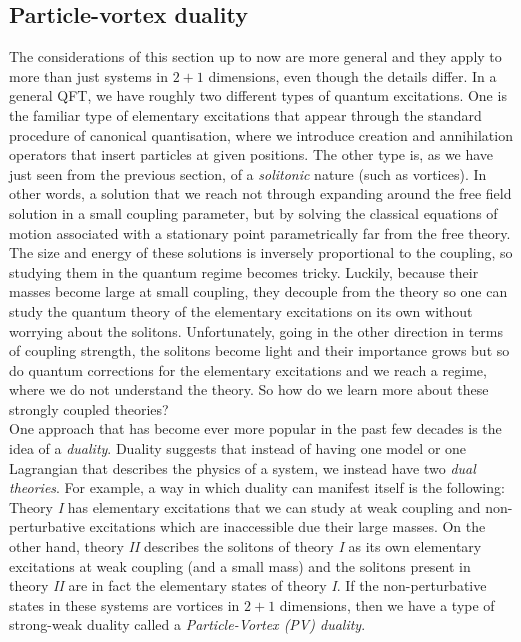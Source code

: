     \subsection{Particle-vortex duality}
    The considerations of this section up to now are more general and they apply to more than just systems in $2+1$ dimensions, even though the details differ. In a general QFT, we have roughly two different types of quantum excitations. One is the familiar type of elementary excitations that appear through the standard procedure of canonical quantisation, where we introduce creation and annihilation operators that insert particles at  given positions. The other type is, as we have just seen from the previous section, of a \textit{solitonic} nature (such as vortices). In other words, a solution that we reach not through expanding around the free field solution in a small coupling parameter, but by solving the classical equations of motion associated with a stationary point parametrically far from the free theory. The size and energy of these solutions is inversely proportional to the coupling, so studying them in the quantum regime becomes tricky. Luckily, because their masses become large at small coupling, they decouple from the theory so one can study the quantum theory of the elementary excitations on its own without worrying about the solitons. Unfortunately, going in the other direction in terms of coupling strength, the solitons become light and their importance grows but so do quantum corrections for the elementary excitations and we reach a regime, where we do not understand the theory. So how do we learn more about these strongly coupled theories? \\
    \indent One approach that has become ever more popular in the past few decades is the idea of a \textit{duality}. Duality suggests that instead of having one model or one Lagrangian that describes the physics of a system, we instead have two \textit{dual theories}. For example, a way in which duality can manifest itself is the following:\\
    \indent Theory \textit{I} has elementary excitations that we can study at weak coupling and non-perturbative excitations which are inaccessible due their large masses. On the other hand, theory \textit{II} describes the solitons of theory \textit{I} as its own elementary excitations at weak coupling (and a small mass) and the solitons present in theory \textit{II} are in fact the elementary states of theory \textit{I}. If the non-perturbative states in these systems are vortices in $2+1$ dimensions, then we have a type of strong-weak duality called a \textit{Particle-Vortex (PV) duality}. \\
